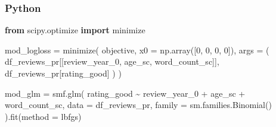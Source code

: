 \documentclass[
  letterpaper,
]{krantz}
\newenvironment{Shaded}{}{}
\newcommand{\AttributeTok}[1]{\textcolor[rgb]{0.49,0.56,0.16}{#1}}
\newcommand{\DecValTok}[1]{\textcolor[rgb]{0.25,0.63,0.44}{#1}}
\newcommand{\FunctionTok}[1]{\textcolor[rgb]{0.02,0.16,0.49}{#1}}
\newcommand{\ImportTok}[1]{\textcolor[rgb]{0.00,0.50,0.00}{\textbf{#1}}}
\newcommand{\NormalTok}[1]{#1}
\newcommand{\OperatorTok}[1]{\textcolor[rgb]{0.40,0.40,0.40}{#1}}
\newcommand{\OtherTok}[1]{\textcolor[rgb]{0.00,0.44,0.13}{#1}}
\newcommand{\SpecialCharTok}[1]{\textcolor[rgb]{0.25,0.44,0.63}{#1}}
\newcommand{\StringTok}[1]{\textcolor[rgb]{0.25,0.44,0.63}{#1}}
\begin{document}
\begin{Shaded}
\end{Shaded}

\subsubsection{Python}

\begin{Shaded}
\begin{Highlighting}[]
\ImportTok{from}\NormalTok{ scipy.optimize }\ImportTok{import}\NormalTok{ minimize}

\NormalTok{mod\_logloss }\OperatorTok{=}\NormalTok{ minimize(}
\NormalTok{    objective,}
\NormalTok{    x0 }\OperatorTok{=}\NormalTok{ np.array([}\DecValTok{0}\NormalTok{, }\DecValTok{0}\NormalTok{, }\DecValTok{0}\NormalTok{, }\DecValTok{0}\NormalTok{]),}
\NormalTok{    args }\OperatorTok{=}\NormalTok{ (}
\NormalTok{        df\_reviews\_pr[[}\StringTok{\textquotesingle{}review\_year\_0\textquotesingle{}}\NormalTok{, }\StringTok{\textquotesingle{}age\_sc\textquotesingle{}}\NormalTok{, }\StringTok{\textquotesingle{}word\_count\_sc\textquotesingle{}}\NormalTok{]], }
\NormalTok{        df\_reviews\_pr[}\StringTok{\textquotesingle{}rating\_good\textquotesingle{}}\NormalTok{]}
\NormalTok{    )}
\NormalTok{)}

\NormalTok{mod\_glm }\OperatorTok{=}\NormalTok{ smf.glm(}
    \StringTok{\textquotesingle{}rating\_good \textasciitilde{} review\_year\_0 + age\_sc + word\_count\_sc\textquotesingle{}}\NormalTok{,}
\NormalTok{    data   }\OperatorTok{=}\NormalTok{ df\_reviews\_pr,}
\NormalTok{    family }\OperatorTok{=}\NormalTok{ sm.families.Binomial()}
\NormalTok{).fit(method }\OperatorTok{=} \StringTok{\textquotesingle{}lbfgs\textquotesingle{}}\NormalTok{)}
\end{Highlighting}
\end{Shaded}
\end{document}
